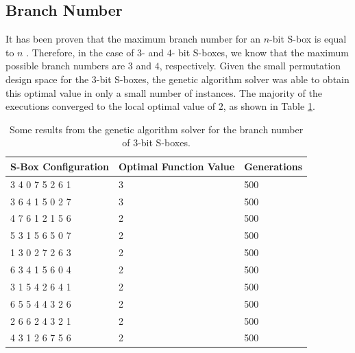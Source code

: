 \documentclass[11pt]{article}
\begin{document}
\subsection{Branch Number}


It has been proven that the maximum branch number for an $n$-bit S-box is equal to $n$ \cite{MaxBN}. Therefore, in the case of $3$- and $4$- bit S-boxes, we know that the maximum possible branch numbers are $3$ and $4$, respectively. Given the small permutation design space for the $3$-bit S-boxes, the genetic algorithm solver was able to obtain this optimal value in only a small number of instances. The majority of the executions converged to the local optimal value of $2$, as shown in Table \ref{bnTable}.

\begin{table}
	\centering
	\label{bnTable}
	\caption{Some results from the genetic algorithm solver for the branch number of $3$-bit S-boxes.}
    \begin{tabular}{|l|l|l|}
        \hline
        S-Box Configuration & Optimal Function Value & Generations \\ \hline
        3     4     0     7     5     2     6     1 & 3 & 500 \\ 
	3     6     4     1     5     0     2     7 & 3 & 500 \\ 
        4     7     6     1     2     1     5     6 & 2 & 500 \\ 
        5     3     1     5     6     5     0     7 & 2 & 500 \\ 
        1     3     0     2     7     2     6     3 & 2 & 500 \\ 
        6     3     4     1     5     6     0     4 & 2 & 500 \\ 
        3     1     5     4     2     6     4     1 & 2 & 500 \\ 
        6     5     5     4     4     3     2     6 & 2 & 500 \\ 
        2     6     6     2     4     3     2     1 & 2 & 500 \\ 
        4     3     1     2     6     7     5     6 & 2 & 500 \\
        \hline
    \end{tabular}
\end{table}
\end{document}
